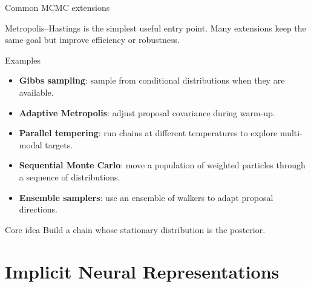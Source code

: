 \documentclass[aspectratio=169]{beamer}
\begin{document}
\begin{frame}{Common MCMC extensions}
\small

Metropolis--Hastings is the simplest useful entry point. Many extensions keep the same goal but improve efficiency or robustness.

\begin{block}{Examples}
\begin{itemize}
    \item[--] \textbf{Gibbs sampling}: sample from conditional distributions when they are available.
    \item[--] \textbf{Adaptive Metropolis}: adjust proposal covariance during warm-up.
    \item[--] \textbf{Parallel tempering}: run chains at different temperatures to explore multi-modal targets.
    \item[--] \textbf{Sequential Monte Carlo}: move a population of weighted particles through a sequence of distributions.
    \item[--] \textbf{Ensemble samplers}: use an ensemble of walkers to adapt proposal directions.
\end{itemize}
\end{block}

\begin{alertblock}{Core idea}
Build a chain whose stationary distribution is the posterior.
\end{alertblock}
\end{frame}

\section{Implicit Neural Representations}
\end{document}
